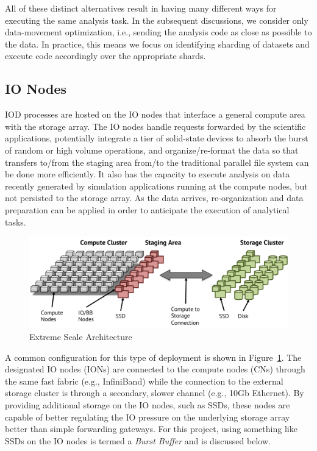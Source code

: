 \documentclass[conference]{IEEEtran} \pdfpagewidth=8.5in
\begin{document}
All of these distinct alternatives result in having many different ways for
executing the same analysis task.  In the subsequent discussions, we consider
only data-movement optimization, i.e., sending the analysis code as close as
possible to the data. In practice, this means we focus on identifying sharding
of datasets and execute code accordingly over the appropriate shards.

\subsection{IO Nodes}
IOD processes are hosted on the IO nodes that interface a general compute area
with the storage array. The IO nodes handle requests forwarded by the
scientific applications, potentially integrate a tier of solid-state devices to
absorb the burst of random or high volume operations, and organize/re-format
the data so that transfers to/from the staging area from/to the traditional
parallel file system can be done more efficiently. It also has the capacity to
execute analysis on data recently generated by simulation applications running
at the compute nodes, but not persisted to the storage array. As the data
arrives, re-organization and data preparation can be applied in order to
anticipate the execution of analytical tasks.

\begin{figure}[htbp]
\centering
\includegraphics[width=\columnwidth]{images/exa-arch.png}
\caption{Extreme Scale Architecture}
\label{fig:exa-arch}
\end{figure}

A common configuration for this type of deployment is shown in
Figure~\ref{fig:exa-arch}. The designated IO nodes (IONs) are connected to the
compute nodes (CNs) through the same fast fabric (e.g., InfiniBand) while the
connection to the external storage cluster is through a secondary, slower
channel (e.g., 10Gb Ethernet). By providing additional storage on the IO nodes,
such as SSDs, these nodes are capable of better regulating the IO pressure on
the underlying storage array better than simple forwarding gateways. For this
project, using something like SSDs on the IO nodes is termed a {\em Burst
Buffer} and is discussed below.
\end{document}
